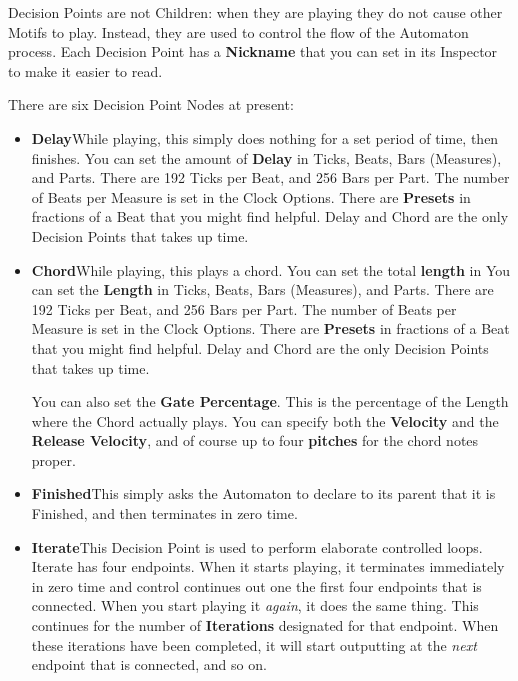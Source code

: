 \documentclass[twoside,10pt]{article}
\begin{document}
Decision Points are not Children: when they are playing they do not cause other Motifs to play.  Instead, they are used to control the flow of the Automaton process.    Each Decision Point has a {\bf Nickname} that you can set in its Inspector to make it easier to read.  

There are six Decision Point Nodes at present:

\begin{itemize}
\item{\bf Delay}\quad While playing, this simply does nothing for a set period of time, then finishes.  You can set the amount of {\bf Delay} in Ticks, Beats, Bars (Measures), and Parts.  There are 192 Ticks per Beat, and 256 Bars per Part.  The number of Beats per Measure is set in the Clock Options.  There are {\bf Presets} in fractions of a Beat that you might find helpful.  Delay and Chord are the only Decision Points that takes up time.

\item{\bf Chord}\quad While playing, this plays a chord.  You can set the total {\bf length} in  You can set the {\bf Length} in Ticks, Beats, Bars (Measures), and Parts.  There are 192 Ticks per Beat, and 256 Bars per Part.  The number of Beats per Measure is set in the Clock Options.  There are {\bf Presets} in fractions of a Beat that you might find helpful.  Delay and Chord are the only Decision Points that takes up time.

You can also set the {\bf Gate Percentage}.  This is the percentage of the Length where the Chord actually plays.   You can specify both the {\bf Velocity} and the {\bf Release Velocity}, and of course up to four {\bf pitches} for the chord notes proper.

\item{\bf Finished}\quad This simply asks the Automaton to declare to its parent that it is Finished, and then terminates in zero time.

\item{\bf Iterate}\quad This Decision Point is used to perform elaborate controlled loops.  Iterate  has four endpoints.  When it starts playing, it terminates immediately in zero time and control continues out one the first four endpoints that is connected. When you start playing it {\it again}, it does the same thing.  This continues for the number of {\bf Iterations} designated for that endpoint.  When these iterations have been completed, it will start outputting at the {\it next} endpoint that is connected, and so on. 


\end{itemize}
\end{document}
